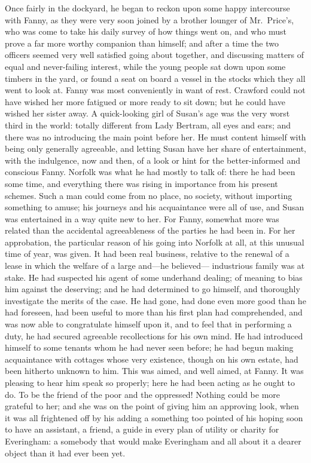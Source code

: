 Once fairly in the dockyard, he began to reckon upon
some happy intercourse with Fanny, as they were very soon
joined by a brother lounger of Mr.\ Price's, who was come
to take his daily survey of how things went on, and who
must prove a far more worthy companion than himself;
and after a time the two officers seemed very well satisfied
going about together, and discussing matters of equal
and never-failing interest, while the young people sat down
upon some timbers in the yard, or found a seat on board
a vessel in the stocks which they all went to look at.
Fanny was most conveniently in want of rest.  Crawford could
not have wished her more fatigued or more ready to sit down;
but he could have wished her sister away.  A quick-looking
girl of Susan's age was the very worst third in the world:
totally different from Lady Bertram, all eyes and ears;
and there was no introducing the main point before her.
He must content himself with being only generally agreeable,
and letting Susan have her share of entertainment,
with the indulgence, now and then, of a look or hint
for the better-informed and conscious Fanny.  Norfolk was
what he had mostly to talk of:  there he had been some time,
and everything there was rising in importance from his
present schemes.  Such a man could come from no place,
no society, without importing something to amuse;
his journeys and his acquaintance were all of use,
and Susan was entertained in a way quite new to her.
For Fanny, somewhat more was related than the accidental
agreeableness of the parties he had been in.
For her approbation, the particular reason of his going into
Norfolk at all, at this unusual time of year, was given.
It had been real business, relative to the renewal of a
lease in which the welfare of a large and---he believed---%
industrious family was at stake.  He had suspected his
agent of some underhand dealing; of meaning to bias him
against the deserving; and he had determined to go himself,
and thoroughly investigate the merits of the case.
He had gone, had done even more good than he had foreseen,
had been useful to more than his first plan had comprehended,
and was now able to congratulate himself upon it, and to
feel that in performing a duty, he had secured agreeable
recollections for his own mind.  He had introduced himself
to some tenants whom he had never seen before; he had begun
making acquaintance with cottages whose very existence,
though on his own estate, had been hitherto unknown to him.
This was aimed, and well aimed, at Fanny.  It was pleasing
to hear him speak so properly; here he had been acting
as he ought to do.  To be the friend of the poor and
the oppressed!  Nothing could be more grateful to her;
and she was on the point of giving him an approving look,
when it was all frightened off by his adding a something
too pointed of his hoping soon to have an assistant,
a friend, a guide in every plan of utility or charity
for Everingham:  a somebody that would make Everingham
and all about it a dearer object than it had ever been
yet.

